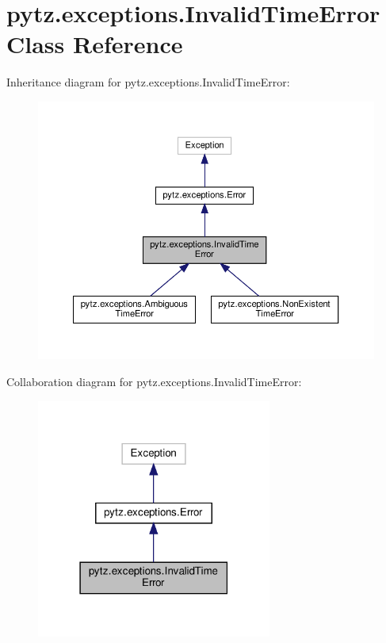 \hypertarget{classpytz_1_1exceptions_1_1InvalidTimeError}{}\section{pytz.\+exceptions.\+Invalid\+Time\+Error Class Reference}
\label{classpytz_1_1exceptions_1_1InvalidTimeError}


Inheritance diagram for pytz.\+exceptions.\+Invalid\+Time\+Error\+:
\nopagebreak
\begin{figure}[H]
\begin{center}
\leavevmode
\includegraphics[width=350pt]{classpytz_1_1exceptions_1_1InvalidTimeError__inherit__graph}
\end{center}
\end{figure}


Collaboration diagram for pytz.\+exceptions.\+Invalid\+Time\+Error\+:
\nopagebreak
\begin{figure}[H]
\begin{center}
\leavevmode
\includegraphics[width=219pt]{classpytz_1_1exceptions_1_1InvalidTimeError__coll__graph}
\end{center}
\end{figure}


